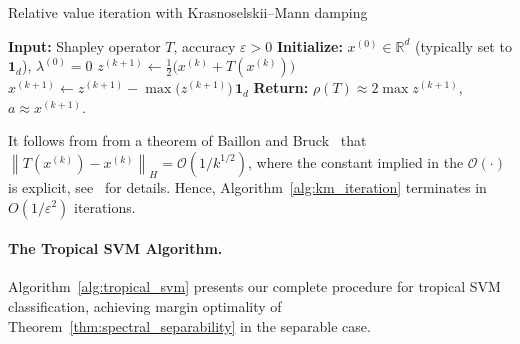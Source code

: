 \documentclass{article}
\renewcommand{\leq}{\leqslant}
\newcommand{\R}{\mathbb{R}}
\begin{document}
\begin{algorithm}
\caption{Relative value iteration with Krasnoselskii--Mann damping~\cite{akianmfcs}}\label{alg:km_iteration}
\begin{algorithmic}[1]
\STATE \textbf{Input:} Shapley operator $T$, accuracy $\varepsilon > 0$
\STATE \textbf{Initialize:} $x^{(0)} \in \R^d$ (typically set to $\mathbf{1}_d$), $\lambda^{(0)} = 0$
\REPEAT
  \STATE $z^{(k+1)} \leftarrow \frac{1}{2}\bigl(x^{(k)} + T(x^{(k)})\bigr)$
  \STATE $x^{(k+1)} \leftarrow z^{(k+1)} - \max\bigl(z^{(k+1)}\bigr)\,\mathbf{1}_d$ 
  \UNTIL{$\left\|T(x^{(k)})-x^{(k)}\right\|_H\leq \varepsilon$}
  \STATE \textbf{Return:} $\rho(T) \approx 2\max z^{(k+1)}$,
  $a \approx x^{(k+1)}$.
\end{algorithmic}
\end{algorithm}
It follows from from a theorem of Baillon and Bruck~\cite{baillonbruck} that $\left\|T(x^{(k)})-x^{(k)}\right\|_H
= \mathcal{O}(1/k^{1/2})$, where the constant implied in the $\mathcal{O}(\cdot)$ is explicit, 
see~\cite{akianmfcs} for details. 
Hence, Algorithm~\ref{alg:km_iteration} terminates in $O(1/\varepsilon^2)$ iterations.

\paragraph{The Tropical SVM Algorithm.}\label{subsec:complete_algorithm}
Algorithm~\ref{alg:tropical_svm} presents our complete procedure for tropical SVM classification, achieving margin optimality of Theorem~\ref{thm:spectral_separability} in the separable case.
\end{document}
